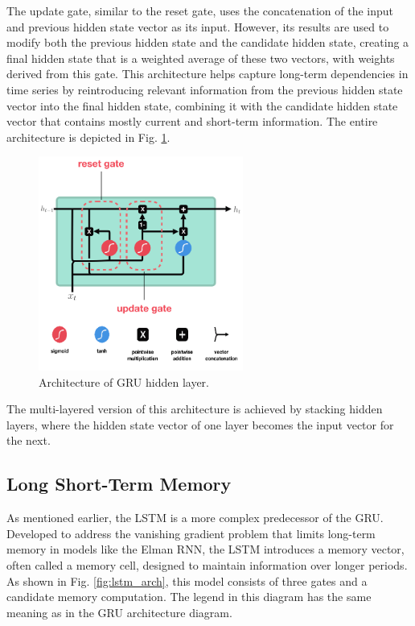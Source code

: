The update gate, similar to the reset gate, uses the concatenation of the input and previous hidden state vector as its input. However, its results are used to modify both the previous hidden state and the candidate hidden state, creating a final hidden state that is a weighted average of these two vectors, with weights derived from this gate. This architecture helps capture long-term dependencies in time series by reintroducing relevant information from the previous hidden state vector into the final hidden state, combining it with the candidate hidden state vector that contains mostly current and short-term information. The entire architecture is depicted in Fig. \ref{fig:gru_arch}.
\\

\begin{figure}[!h]
	\centering
	
	\includegraphics[width=0.6\textwidth]{images/GRU_arch.png}
	
	\caption{Architecture of GRU hidden layer.}
	\label{fig:gru_arch}
\end{figure}

The multi-layered version of this architecture is achieved by stacking hidden layers, where the hidden state vector of one layer becomes the input vector for the next.

\subsection{Long Short-Term Memory}

As mentioned earlier, the LSTM is a more complex predecessor of the GRU. Developed to address the vanishing gradient problem that limits long-term memory in models like the Elman RNN, the LSTM introduces a memory vector, often called a memory cell, designed to maintain information over longer periods. As shown in Fig. \ref{fig:lstm_arch}, this model consists of three gates and a candidate memory computation. The legend in this diagram has the same meaning as in the GRU architecture diagram.
\\

